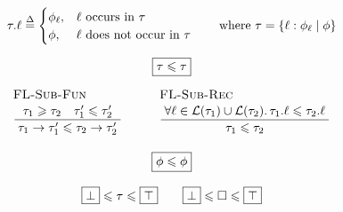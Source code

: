 $$ 
\begin{array}{c}
\flproj{\tau}{\ell} \defeq \begin{cases}
    \phi_\ell, & \ell \text{ occurs in } \tau \\
    \phi, & \ell \text{ does not occur in } \tau
\end{cases} \qquad \text{where } \tau = \{ \ell : \phi_\ell \mid \phi \}
\\[1.5em]
\boxed{\tau \sub \tau}
\\[0.5em]
\irule{FL-Sub-Fun}{\tau_1 \super \tau_2 \quad \tau_1' \sub \tau_2'}{\tau_1 \to \tau_1' \sub \tau_2 \to \tau_2'}
\qquad
\irule{FL-Sub-Rec}{\forall \ell \in \mathcal L(\tau_1) \cup \mathcal L(\tau_2) \ldotp \flproj{\tau_1}{\ell} \sub \flproj{\tau_2}{\ell}}{\tau_1 \sub \tau_2}
\\[2.5em]
\boxed{\phi \sub \phi}
\\[1em]
\flfbot \sub \tau \sub \flftop \qquad \flfbot \sub \flabsent \sub \flftop
\end{array} 
$$
